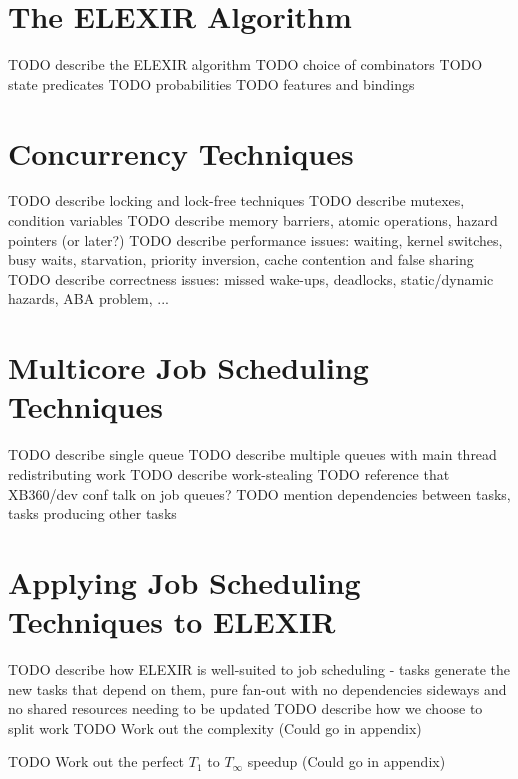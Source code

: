 \section{The ELEXIR Algorithm}

TODO describe the ELEXIR algorithm
TODO choice of combinators
TODO state predicates
TODO probabilities
TODO features and bindings

\section{Concurrency Techniques}

TODO describe locking and lock-free techniques
TODO describe mutexes, condition variables
TODO describe memory barriers, atomic operations, hazard pointers (or later?)
TODO describe performance issues: waiting, kernel switches, busy waits, starvation, priority inversion, cache contention and false sharing
TODO describe correctness issues: missed wake-ups, deadlocks, static/dynamic hazards, ABA problem, ...

\section{Multicore Job Scheduling Techniques}

TODO describe single queue
TODO describe multiple queues with main thread redistributing work
TODO describe work-stealing
TODO reference that XB360/dev conf talk on job queues?
TODO mention dependencies between tasks, tasks producing other tasks

\section{Applying Job Scheduling Techniques to ELEXIR}

TODO describe how ELEXIR is well-suited to job scheduling - tasks generate the new tasks that depend on them, pure fan-out with no dependencies sideways and no shared resources needing to be updated
TODO describe how we choose to split work
TODO Work out the complexity (Could go in appendix)

TODO Work out the perfect $T_1$ to $T_\infty$ speedup (Could go in appendix)
